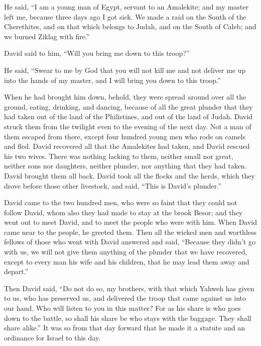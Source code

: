He said, ``I am a young man of Egypt, servant to an Amalekite; and my
master left me, because three days ago I got sick.  We made
a raid on the South of the Cherethites, and on that which belongs to
Judah, and on the South of Caleb; and we burned Ziklag with fire.''

 David said to him, ``Will you bring me down to this
troop?''

He said, ``Swear to me by God that you will not kill me and not deliver
me up into the hands of my master, and I will bring you down to this
troop.''

 When he had brought him down, behold, they were spread
around over all the ground, eating, drinking, and dancing, because of
all the great plunder that they had taken out of the land of the
Philistines, and out of the land of Judah.  David struck
them from the twilight even to the evening of the next day. Not a man of
them escaped from there, except four hundred young men who rode on
camels and fled.  David recovered all that the Amalekites
had taken, and David rescued his two wives.  There was
nothing lacking to them, neither small nor great, neither sons nor
daughters, neither plunder, nor anything that they had taken. David
brought them all back.  David took all the flocks and the
herds, which they drove before those other livestock, and said, ``This
is David's plunder.''

 David came to the two hundred men, who were so faint that
they could not follow David, whom also they had made to stay at the
brook Besor; and they went out to meet David, and to meet the people who
were with him. When David came near to the people, he greeted them.
 Then all the wicked men and worthless fellows of those who
went with David answered and said, ``Because they didn't go with us, we
will not give them anything of the plunder that we have recovered,
except to every man his wife and his children, that he may lead them
away and depart.''

 Then David said, ``Do not do so, my brothers, with that
which Yahweh has given to us, who has preserved us, and delivered the
troop that came against us into our hand.  Who will listen
to you in this matter? For as his share is who goes down to the battle,
so shall his share be who stays with the baggage. They shall share
alike.''  It was so from that day forward that he made it a
statute and an ordinance for Israel to this day.

